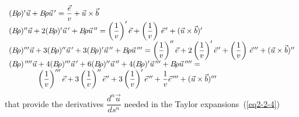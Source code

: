 \begin{equation}
	\begin{array}{l}
		(\Br )^\prime\vec  u+\Br\vec  u^{\,\prime} 
		     =  \dfrac{\vec e }{ v} + \vec  u \times  \vec  b \\
		(\Br)^{\prime\prime}\vec  u+ 2(\Br )^\prime\vec  u^{\,\prime} 
		  +\Br\vec u^{\,\prime\prime} 
		     = \left(\dfrac{1 }{ v}\right)^\prime\vec  e + \left(\dfrac{1 }{ v}\right)\,\vec  e^{\,\prime}
		       +(\vec  u\times\vec  b)^\prime \\
		(\Br)^{\prime\prime\prime}\vec  u +3(\Br )^{\prime\prime}\vec  u^{\,\prime}
		  +3 (\Br )^\prime\vec  u^{\,\prime\prime} +\Br\vec  u^{\,\prime\prime\prime}
		     =  \left(\dfrac{1 }{ v}\right)^{\prime\prime}\vec  e
		     + 2\left(\dfrac{1 }{ v}\right)^\prime\vec  e^{\,\prime}
		     +\left(\dfrac{1 }{ v}\right)\, \vec  e^{\,\prime\prime} 
		     +(\vec  u\times\vec  b)^{\prime\prime} \\
		(\Br )^{\quaprime}\vec  u + 4(\Br )^{\prime\prime\prime}\vec  u^{\,\prime} 
		  +6 (\Br )^{\prime\prime}\vec u^{\,\prime\prime} +4(\Br )^\prime
		  \vec  u^{\,\prime\prime\prime} +\Br\vec u^{\quaprime} = \\
		\hphantom{(\Br )^{\quaprime}\vec  u}
		 \left(\dfrac{1 }{ v}\right)^{\prime\prime\prime}\vec  e 
		   + 3\left(\dfrac{1 }{ v}\right)^{\prime\prime}\vec e^{\,\prime} 
		   +3\left(\dfrac{1 }{ v}\right)^\prime\vec  e^{\,\prime\prime} 
		   +\dfrac{1 }{ v} \vec e^{\,\prime\prime\prime} +(\vec  u\times\vec  b)^{\prime\prime\prime}
	\end{array} 
	\label{eq2-2-18}
\end{equation}
%
 that provide the derivatives $ \dfrac{ d^n\vec  u }{ ds^n}$ needed in the Taylor 
 expansions~(\ref{eq2-2-4})  

